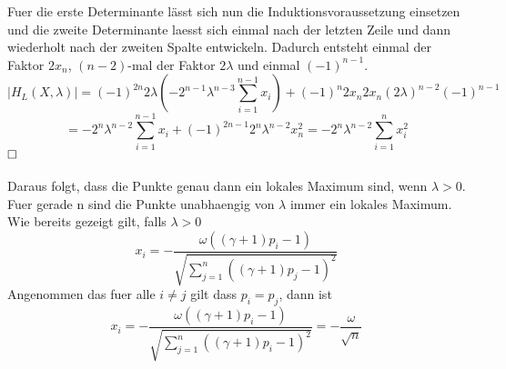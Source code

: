 \documentclass[11pt]{scrartcl}
\begin{document}
			Fuer die erste Determinante lässt sich nun die Induktionsvoraussetzung einsetzen und die zweite Determinante laesst sich einmal nach der letzten Zeile und dann wiederholt nach der zweiten Spalte entwickeln. Dadurch entsteht einmal der Faktor \(2x_{n}\), \((n-2)\)-mal der Faktor \(2\lambda\) und einmal \((-1)^{n-1}\).
			\begin{equation}
			|H_{L}(X,\lambda)|=(-1)^{2n}2\lambda(-2^{n-1}\lambda^{n-3}\sum_{i=1}^{n-1}x_{i})+(-1)^{n}2x_{n}2x_{n}(2\lambda)^{n-2}(-1)^{n-1}
			\end{equation}
			\begin{equation}
			=-2^{n}\lambda^{n-2}\sum_{i=1}^{n-1}x_{i}+(-1)^{2n-1}2^{n}\lambda^{n-2}x_{n}^{2}
			=-2^n\lambda^{n-2}\sum_{i=1}^{n}x_{i}^2
			\end{equation}
			$\hfill\square$\\\\
			Daraus folgt, dass die Punkte genau dann ein lokales Maximum sind, wenn \(\lambda>0\). Fuer gerade n sind die Punkte unabhaengig von \(\lambda\) immer ein lokales Maximum. Wie bereits gezeigt gilt, falls \(\lambda>0\)
			\begin{equation}
			x_{i}=-\frac{\omega((\gamma +1)p_{i}-1)}{\sqrt{\sum_{j=1}^{n}((\gamma +1)p_{j}-1)^2}}
			\end{equation}
			Angenommen das fuer alle \(i\neq j\) gilt dass \(p_{i}=p_{j}\), dann ist
			\begin{equation}
			x_{i}=-\frac{\omega((\gamma +1)p_{i}-1)}{\sqrt{\sum_{j=1}^{n}((\gamma +1)p_{i}-1)^2}}
			=-\frac{\omega}{\sqrt{n}}
			\end{equation}
\end{document}
